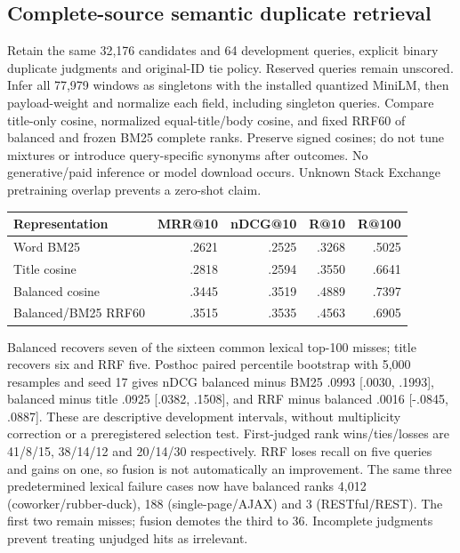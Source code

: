 \documentclass[11pt]{article}
\begin{document}
\subsection{Complete-source semantic duplicate retrieval}
Retain the same 32,176 candidates and 64 development queries, explicit binary
duplicate judgments and original-ID tie policy. Reserved queries remain unscored.
Infer all 77,979 windows as singletons with the installed quantized MiniLM,
then payload-weight and normalize each field, including singleton queries.
Compare title-only cosine, normalized equal-title/body cosine, and fixed RRF60
of balanced and frozen BM25 complete ranks\cite{rrf2009}. Preserve signed cosines;
do not tune mixtures or introduce query-specific synonyms after outcomes.
No generative/paid inference or model download occurs. Unknown Stack Exchange
pretraining overlap prevents a zero-shot claim\cite{minilmcard}.

\begin{center}
\begin{tabular}{lrrrr}
\hline
Representation & MRR@10 & nDCG@10 & R@10 & R@100\\
\hline
Word BM25 & .2621 & .2525 & .3268 & .5025\\
Title cosine & .2818 & .2594 & .3550 & .6641\\
Balanced cosine & .3445 & .3519 & .4889 & .7397\\
Balanced/BM25 RRF60 & .3515 & .3535 & .4563 & .6905\\
\hline
\end{tabular}
\end{center}
Balanced recovers seven of the sixteen common lexical top-100 misses;
title recovers six and RRF five. Posthoc paired percentile bootstrap with
5,000 resamples and seed 17 gives nDCG balanced minus BM25 .0993
[.0030, .1993], balanced minus title .0925 [.0382, .1508], and RRF minus
balanced .0016 [-.0845, .0887]. These are descriptive development intervals,
without multiplicity correction or a preregistered selection test. First-judged
rank wins/ties/losses are 41/8/15, 38/14/12 and 20/14/30 respectively.
RRF loses recall on five queries and gains on one, so fusion is not automatically
an improvement. The same three predetermined lexical failure cases now have
balanced ranks 4,012 (coworker/rubber-duck), 188 (single-page/AJAX) and 3
(RESTful/REST). The first two remain misses; fusion demotes the third to 36.
Incomplete judgments prevent treating unjudged hits as irrelevant.
\end{document}

